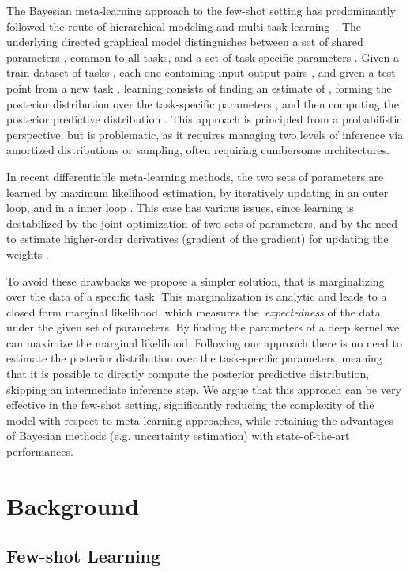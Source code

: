 \documentclass{article}
\begin{document}
The Bayesian meta-learning approach to the few-shot setting has predominantly followed the route of hierarchical modeling and multi-task learning~\citep{finn2018probabilistic, gordon2019meta, yoon2018bayesian}. The underlying directed graphical model distinguishes between a set of shared parameters , common to all tasks, and a set of  task-specific parameters . Given a train dataset of tasks , each one containing input-output pairs , and given a test point  from a new task , learning consists of finding an estimate of , forming the posterior distribution over the task-specific parameters , and then computing the posterior predictive distribution . This approach is principled from a probabilistic perspective, but is problematic, as it requires managing two levels of inference via amortized distributions or sampling, often requiring cumbersome architectures. 

In recent differentiable meta-learning methods, the two sets of parameters are learned by maximum likelihood estimation, by iteratively updating  in an outer loop, and  in a inner loop \citep{finn2017model}. This case has various issues, since learning is destabilized by the joint optimization of two sets of parameters, and by the need to estimate higher-order derivatives (gradient of the gradient) for updating the weights \citep{antoniou2019train}.

To avoid these drawbacks we propose a simpler solution, that is marginalizing  over the data of a specific task. This marginalization is analytic and leads to a closed form marginal likelihood, which measures the~\emph{expectedness} of the data under the given set of parameters. By finding the parameters of a deep kernel we can maximize the marginal likelihood.
Following our approach there is no need to estimate the posterior distribution over the task-specific parameters, meaning that it is possible to directly compute the posterior predictive distribution, skipping an intermediate inference step.  We argue that this approach can be very effective in the few-shot setting, significantly reducing the complexity of the model with respect to meta-learning approaches, while retaining the advantages of Bayesian methods (e.g. uncertainty estimation) with state-of-the-art performances.


\section{Background}

\subsection{Few-shot Learning}\label{ssec_fewshot_learning}
\end{document}
